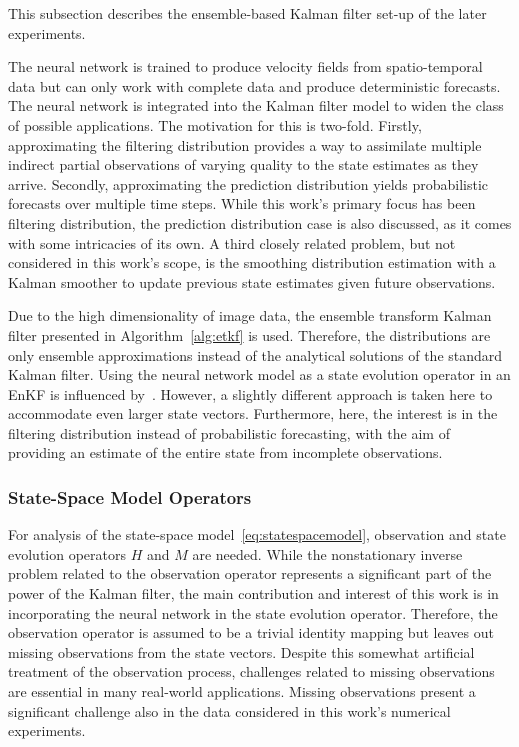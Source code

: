 This subsection describes the ensemble-based Kalman filter set-up of the later experiments.

The neural network is trained to produce velocity fields from spatio-temporal data but can only work with complete data and produce deterministic forecasts.
The neural network is integrated into the Kalman filter model to widen the class of possible applications.
The motivation for this is two-fold.
Firstly, approximating the filtering distribution provides a way to assimilate multiple indirect partial observations of varying quality to the state estimates as they arrive.
Secondly, approximating the prediction distribution yields probabilistic forecasts over multiple time steps.
While this work's primary focus has been filtering distribution, the prediction distribution case is also discussed, as it comes with some intricacies of its own.
A third closely related problem, but not considered in this work's scope, is the smoothing distribution estimation with a Kalman smoother to update previous state estimates given future observations.

Due to the high dimensionality of image data, the ensemble transform Kalman filter presented in Algorithm~\ref{alg:etkf} is used.
Therefore, the distributions are only ensemble approximations instead of the analytical solutions of the standard Kalman filter.
Using the neural network model as a state evolution operator in an EnKF is influenced by~\cite{deepide}.
However, a slightly different approach is taken here to accommodate even larger state vectors.
Furthermore, here, the interest is in the filtering distribution instead of probabilistic forecasting, with the aim of providing an estimate of the entire state from incomplete observations.

\subsubsection{State-Space Model Operators}
For analysis of the state-space model~\eqref{eq:statespacemodel}, observation and state evolution operators $H$ and $M$ are needed.
While the nonstationary inverse problem related to the observation operator represents a significant part of the power of the Kalman filter, the main contribution and interest of this work is in incorporating the neural network in the state evolution operator.
Therefore, the observation operator is assumed to be a trivial identity mapping but leaves out missing observations from the state vectors.
Despite this somewhat artificial treatment of the observation process, challenges related to missing observations are essential in many real-world applications.
Missing observations present a significant challenge also in the data considered in this work's numerical experiments.


